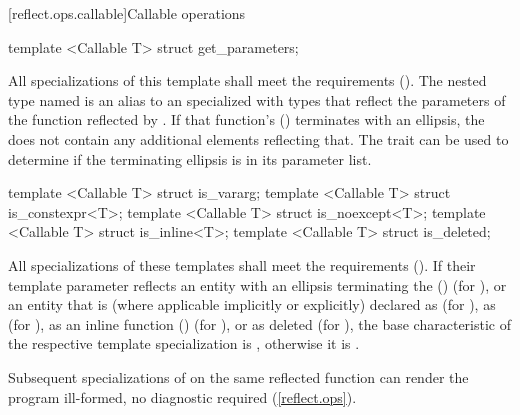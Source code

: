 [reflect.ops.callable]{Callable operations}
\begin{std.txt}\color{addclr}
\begin{itemdecl}
template <Callable T> struct get_parameters;
\end{itemdecl}
\begin{itemdescr}
\pnum
      All specializations of this template shall meet the  requirements (). The nested type named  is an alias to an  specialized with  types that reflect the parameters of the function reflected by .
      If that function's  () terminates with an ellipsis, the  does not contain any additional elements reflecting that. The  trait can be used to determine if the terminating ellipsis is in its parameter list.
\end{itemdescr}

\begin{itemdecl}
template <Callable T> struct is_vararg;
template <Callable T> struct is_constexpr<T>;
template <Callable T> struct is_noexcept<T>;
template <Callable T> struct is_inline<T>;
template <Callable T> struct is_deleted;
\end{itemdecl}
\begin{itemdescr}
\pnum
      All specializations of these templates shall meet the
       requirements ().  If their template
      parameter reflects an entity with an ellipsis terminating the
       () (for
      ), or an entity that is (where applicable implicitly or
      explicitly) declared as  (for ),
      as  (for ), as an inline function
      () (for ), or as deleted (for
      ), the base characteristic of the respective template
      specialization is , otherwise it is .

\pnum
\remarks
Subsequent specializations of  on the same reflected
function can render the program ill-formed, no diagnostic required
(\ref{reflect.ops}).
\end{itemdescr}
\end{std.txt}

